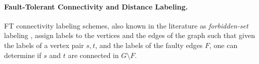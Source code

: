 \paragraph{Fault-Tolerant Connectivity and Distance Labeling.} 
FT connectivity labeling schemes, also known in the literature as \emph{forbidden-set} labeling \cite{CourcelleT07}, assign labels to the vertices and the edges of the graph such that given the labels of a vertex pair $s,t$, and the labels of the faulty edges $F$, one can determine if $s$ and $t$ are connected in $G \setminus F$. 


%
%

